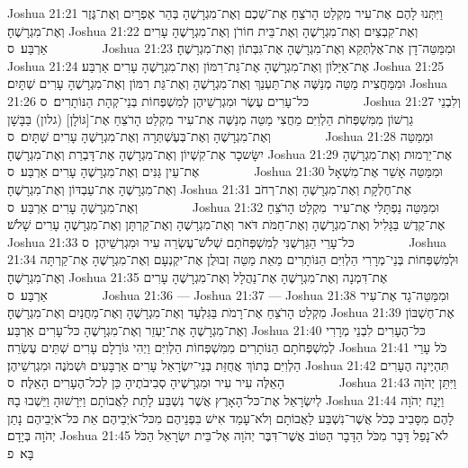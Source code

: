 Joshua 21:21	וַיִּתְּנוּ לָהֶם אֶת־עִיר מִקְלַט הָרֹצֵחַ אֶת־שְׁכֶם וְאֶת־מִגְרָשֶׁהָ בְּהַר אֶפְרָיִם וְאֶת־גֶּזֶר וְאֶת־מִגְרָשֶׁהָ׃
Joshua 21:22	וְאֶת־קִבְצַיִם וְאֶת־מִגְרָשֶׁהָ וְאֶת־בֵּית חוֹרֹן וְאֶת־מִגְרָשֶׁהָ עָרִים אַרְבַּע׃ {ס}        
Joshua 21:23	וּמִמַּטֵּה־דָן אֶת־אֶלְתְּקֵא וְאֶת־מִגְרָשֶׁהָ אֶת־גִּבְּתוֹן וְאֶת־מִגְרָשֶׁהָ׃
Joshua 21:24	אֶת־אַיָּלוֹן וְאֶת־מִגְרָשֶׁהָ אֶת־גַּת־רִמּוֹן וְאֶת־מִגְרָשֶׁהָ עָרִים אַרְבַּע׃
Joshua 21:25	וּמִמַּחֲצִית מַטֵּה מְנַשֶּׁה אֶת־תַּעְנַךְ וְאֶת־מִגְרָשֶׁהָ וְאֶת־גַּת רִמּוֹן וְאֶת־מִגְרָשֶׁהָ עָרִים שְׁתָּיִם׃
Joshua 21:26	כּל־עָרִים עֶשֶׂר וּמִגְרְשֵׁיהֶן לְמִשְׁפְּחוֹת בְּנֵי־קְהָת הַנּוֹתָרִים׃ {ס}        
Joshua 21:27	וְלִבְנֵי גֵרְשׁוֹן מִמִּשְׁפְּחֹת הַלְוִיִּם מֵחֲצִי מַטֵּה מְנַשֶּׁה אֶת־עִיר מִקְלַט הָרֹצֵחַ אֶת־[גּוֹלָן] (גלון) בַּבָּשָׁן וְאֶת־מִגְרָשֶׁהָ וְאֶת־בְּעֶשְׁתְּרָה וְאֶת־מִגְרָשֶׁהָ עָרִים שְׁתָּיִם׃ {ס}        
Joshua 21:28	וּמִמַּטֵּה יִשָּׂשכָר אֶת־קִשְׁיוֹן וְאֶת־מִגְרָשֶׁהָ אֶת־דָּבְרַת וְאֶת־מִגְרָשֶׁהָ׃
Joshua 21:29	אֶת־יַרְמוּת וְאֶת־מִגְרָשֶׁהָ אֶת־עֵין גַּנִּים וְאֶת־מִגְרָשֶׁהָ עָרִים אַרְבַּע׃ {ס}        
Joshua 21:30	וּמִמַּטֵּה אָשֵׁר אֶת־מִשְׁאָל וְאֶת־מִגְרָשֶׁהָ אֶת־עַבְדּוֹן וְאֶת־מִגְרָשֶׁהָ׃
Joshua 21:31	אֶת־חֶלְקָת וְאֶת־מִגְרָשֶׁהָ וְאֶת־רְחֹב וְאֶת־מִגְרָשֶׁהָ עָרִים אַרְבַּע׃ {ס}        
Joshua 21:32	וּמִמַּטֵּה נַפְתָּלִי אֶת־עִיר  מִקְלַט הָרֹצֵחַ אֶת־קֶדֶשׁ בַּגָּלִיל וְאֶת־מִגְרָשֶׁהָ וְאֶת־חַמֹּת דֹּאר וְאֶת־מִגְרָשֶׁהָ וְאֶת־קַרְתָּן וְאֶת־מִגְרָשֶׁהָ עָרִים שָׁלֹשׁ׃
Joshua 21:33	כּל־עָרֵי הַגֵּרְשֻׁנִּי לְמִשְׁפְּחֹתָם שְׁלֹשׁ־עֶשְׂרֵה עִיר וּמִגְרְשֵׁיהֶן׃ {ס}        
Joshua 21:34	וּלְמִשְׁפְּחוֹת בְּנֵי־מְרָרִי הַלְוִיִּם הַנּוֹתָרִים מֵאֵת מַטֵּה זְבוּלֻן אֶת־יקְנְעָם וְאֶת־מִגְרָשֶׁהָ אֶת־קַרְתָּה וְאֶת־מִגְרָשֶׁהָ׃
Joshua 21:35	אֶת־דִּמְנָה וְאֶת־מִגְרָשֶׁהָ אֶת־נַהֲלָל וְאֶת־מִגְרָשֶׁהָ עָרִים אַרְבַּע׃ {ס}        
Joshua 21:36	—
Joshua 21:37	—
Joshua 21:38	וּמִמַּטֵּה־גָד אֶת־עִיר מִקְלַט הָרֹצֵחַ אֶת־רָמֹת בַּגִּלְעָד וְאֶת־מִגְרָשֶׁהָ וְאֶת־מַחֲנַיִם וְאֶת־מִגְרָשֶׁהָ׃
Joshua 21:39	אֶת־חֶשְׁבּוֹן וְאֶת־מִגְרָשֶׁהָ אֶת־יַעְזֵר וְאֶת־מִגְרָשֶׁהָ כּל־עָרִים אַרְבַּע׃
Joshua 21:40	כּל־הֶעָרִים לִבְנֵי מְרָרִי לְמִשְׁפְּחֹתָם הַנּוֹתָרִים מִמִּשְׁפְּחוֹת הַלְוִיִּם וַיְהִי גּוֹרָלָם עָרִים שְׁתֵּים עֶשְׂרֵה׃
Joshua 21:41	כֹּל עָרֵי הַלְוִיִּם בְּתוֹךְ אֲחֻזַּת בְּנֵי־יִשְׂרָאֵל עָרִים אַרְבָּעִים וּשְׁמֹנֶה וּמִגְרְשֵׁיהֶן׃
Joshua 21:42	תִּהְיֶינָה הֶעָרִים הָאֵלֶּה עִיר עִיר וּמִגְרָשֶׁיהָ סְבִיבֹתֶיהָ כֵּן לְכל־הֶעָרִים הָאֵלֶּה׃ {ס}        
Joshua 21:43	וַיִּתֵּן יְהֹוָה לְיִשְׂרָאֵל אֶת־כּל־הָאָרֶץ אֲשֶׁר נִשְׁבַּע לָתֵת לַאֲבוֹתָם וַיִּרָשׁוּהָ וַיֵּשְׁבוּ בָהּ׃
Joshua 21:44	וַיָּנַח יְהֹוָה לָהֶם מִסָּבִיב כְּכֹל אֲשֶׁר־נִשְׁבַּע לַאֲבוֹתָם וְלֹא־עָמַד אִישׁ בִּפְנֵיהֶם מִכּל־אֹיְבֵיהֶם אֵת כּל־אֹיְבֵיהֶם נָתַן יְהֹוָה בְּיָדָם׃
Joshua 21:45	לֹא־נָפַל דָּבָר מִכֹּל הַדָּבָר הַטּוֹב אֲשֶׁר־דִּבֶּר יְהֹוָה אֶל־בֵּית יִשְׂרָאֵל הַכֹּל בָּא׃ {פ}
